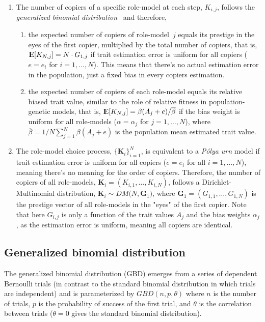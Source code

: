 \documentclass[12pt]{extarticle}
\DeclareMathOperator*{\E}{{\rm I\kern-.3em E}}
\let\vec\mathbf
\begin{document}
\begin{enumerate}
\item 
The number of copiers of a specific role-model at each step, $K_{i,j}$, follows the {\em generalized binomial distribution}~\citep{GBD} and therefore,
\begin{enumerate}\item the expected number of copiers of role-model~$j$ equals its prestige in the eyes of the first copier, multiplied by the total number of copiers, that is,
$\E[K_{N,j}] = N \cdot G_{1,j}$ if trait estimation error is uniform for all copiers ($e=e_i$ for $i=1, \ldots, N$). This means that there's no actual estimation error in the population, just a fixed bias in every copiers estimation.
\item the expected number of copiers of each role-model equals its relative biased trait value, similar to the role of relative fitness in population-genetic models, that is, $\E[K_{N,j}] = \beta(A_j+e) / \overline{\beta}$ if the bias weight is uniform for all role-models ($\alpha=\alpha_j$ for $j=1,\ldots,N$), where $\overline{\beta}=1/N \sum_{j=1}^{N}{\beta(A_j+e)}$ is the population mean estimated trait value. 
\end{enumerate}
\item The role-model choice process, $\{\vec{K}_{i}\}_{i=1}^{N}$, is equivalent to a {\em P\'{o}lya urn} model if trait estimation error is uniform for all copiers ($e=e_i$ for all $i=1, \ldots, N$), meaning there's no meaning for the order of copiers. 
Therefore, the number of copiers of all role-models, $\vec{K}_i = (K_{i,1}, \ldots, K_{i,N})$, follows a Dirichlet-Multinomial distribution,
$\vec{K}_i \sim \mathit{DM}\big(N, \vec{G}_1\big)$, where $\vec{G}_1 = (G_{1,1}, \ldots, G_{1,N})$ is the prestige vector of all role-models in the "eyes" of the first copier.
Note that here $G_{i,j}$ is only a function of the trait values $A_j$ and the bias weights $\alpha_j$, as the estimation error is uniform, meaning all copiers are identical.
\end{enumerate}


\subsection{Generalized binomial distribution}
The generalized binomial distribution (GBD) emerges from a series of dependent Bernoulli trials (in contrast to the standard binomial distribution in which trials are independent) and is parameterized by $GBD(n, p, \theta)$ where $n$ is the number of trials, $p$ is the probability of success of the first trial, and $\theta$ is the correlation between trials ($\theta=0$ gives the standard binomial distribution).
\\
\end{document}
